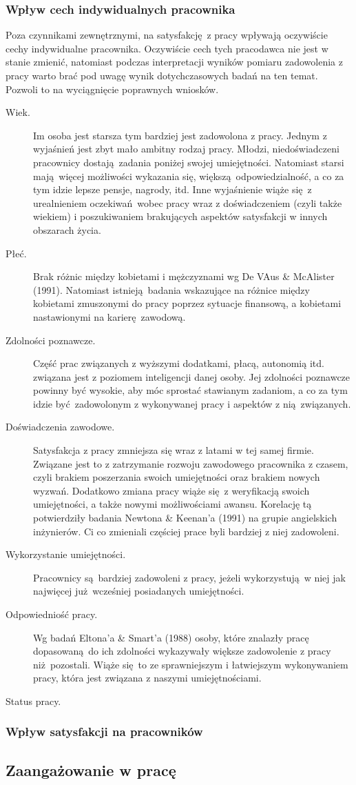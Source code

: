 \subsubsection{Wpływ cech indywidualnych pracownika}
Poza czynnikami zewnętrznymi, na satysfakcję z pracy wpływają oczywiście cechy indywidualne pracownika. Oczywiście cech tych pracodawca nie jest w stanie zmienić, natomiast podczas interpretacji wyników pomiaru zadowolenia z pracy warto brać pod uwagę wynik dotychczasowych badań na ten temat. Pozwoli to na wyciągnięcie poprawnych wniosków.

\begin{description}
\item[Wiek.] Im osoba jest starsza tym bardziej jest zadowolona z pracy. Jednym z wyjaśnień jest zbyt mało ambitny rodzaj pracy. Młodzi, niedoświadczeni pracownicy dostają zadania poniżej swojej umiejętności. Natomiast starsi mają więcej możliwości wykazania się, większą odpowiedzialność, a co za tym idzie lepsze pensje, nagrody, itd. Inne wyjaśnienie wiąże się z urealnieniem oczekiwań wobec pracy wraz z doświadczeniem (czyli
także wiekiem) i poszukiwaniem brakujących aspektów satysfakcji w innych obszarach życia.
\item[Płeć.] Brak różnic między kobietami i mężczyznami wg De VAus \& McAlister (1991). Natomiast istnieją badania wskazujące na różnice między kobietami zmuszonymi do pracy poprzez sytuacje finansową, a kobietami nastawionymi na karierę zawodową.
\item[Zdolności poznawcze.] Część prac związanych z wyższymi dodatkami, płacą, autonomią itd. związana jest z poziomem inteligencji danej osoby. Jej zdolności poznawcze powinny być wysokie, aby móc sprostać stawianym zadaniom, a co za tym idzie być zadowolonym z wykonywanej pracy i aspektów z nią związanych.
\item[Doświadczenia zawodowe.] Satysfakcja z pracy zmniejsza się wraz z latami w tej samej firmie. Związane jest to z zatrzymanie rozwoju zawodowego pracownika z czasem, czyli brakiem poszerzania swoich umiejętności oraz brakiem nowych wyzwań. Dodatkowo zmiana pracy wiąże się z weryfikacją swoich umiejętności, a także nowymi możliwościami awansu. Korelację tą potwierdziły badania Newtona \& Keenan'a (1991) na grupie angielskich inżynierów. Ci co zmieniali częściej prace byli bardziej z niej zadowoleni.
\item[Wykorzystanie umiejętności.] Pracownicy są bardziej zadowoleni z pracy, jeżeli wykorzystują w niej jak najwięcej już wcześniej posiadanych umiejętności.
\item[Odpowiedniość pracy.] Wg badań Eltona'a \& Smart'a (1988) osoby, które znalazły pracę dopasowaną do ich zdolności wykazywały większe zadowolenie z pracy niż pozostali. Wiąże się to ze sprawniejszym i łatwiejszym wykonywaniem pracy, która jest związana z naszymi umiejętnościami.
\item[Status pracy.]
\end{description}
\subsubsection{Wpływ satysfakcji na pracowników}
\subsection{Zaangażowanie w pracę}
